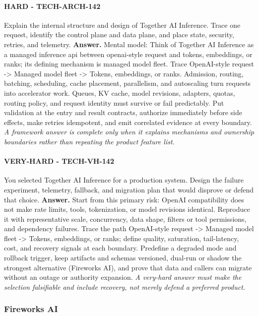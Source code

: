 \paragraph{HARD - TECH-ARCH-142} Explain the internal structure and design of Together AI Inference. Trace one request, identify the control plane and data plane, and place state, security, retries, and telemetry.
\textbf{Answer.} Mental model: Think of Together AI Inference as a managed inference api between openai-style request and tokens, embeddings, or ranks; its defining mechanism is managed model fleet. Trace OpenAI-style request -> Managed model fleet -> Tokens, embeddings, or ranks. Admission, routing, batching, scheduling, cache placement, parallelism, and autoscaling turn requests into accelerator work. Queues, KV cache, model revisions, adapters, quotas, routing policy, and request identity must survive or fail predictably. Put validation at the entry and result contracts, authorize immediately before side effects, make retries idempotent, and emit correlated evidence at every boundary.
\textit{A framework answer is complete only when it explains mechanisms and ownership boundaries rather than repeating the product feature list.}
\paragraph{VERY-HARD - TECH-VH-142} You selected Together AI Inference for a production system. Design the failure experiment, telemetry, fallback, and migration plan that would disprove or defend that choice.
\textbf{Answer.} Start from this primary risk: OpenAI compatibility does not make rate limits, tools, tokenization, or model revisions identical. Reproduce it with representative scale, concurrency, data shape, filters or tool permissions, and dependency failures. Trace the path OpenAI-style request -> Managed model fleet -> Tokens, embeddings, or ranks; define quality, saturation, tail-latency, cost, and recovery signals at each boundary. Predefine a degraded mode and rollback trigger, keep artifacts and schemas versioned, dual-run or shadow the strongest alternative (Fireworks AI), and prove that data and callers can migrate without an outage or authority expansion.
\textit{A very-hard answer must make the selection falsifiable and include recovery, not merely defend a preferred product.}
\subsubsection*{Fireworks AI}
